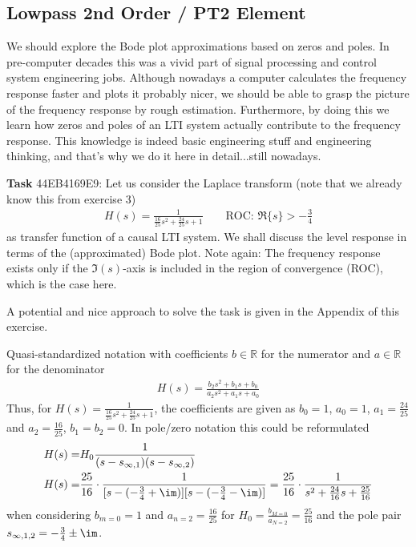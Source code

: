 \newpage
\subsection{Lowpass 2nd Order / PT2 Element}
\label{sec:44EB4169E9}
\begin{Ziel}
We should explore the Bode plot approximations based on zeros and poles.
In pre-computer decades this was a vivid part of signal
processing and control system engineering jobs.
Although nowadays a computer calculates the frequency response faster and plots it
probably nicer, we should be able to grasp the picture of the frequency response
by rough estimation. Furthermore, by doing this we learn how zeros and poles
of an LTI system actually  contribute to the frequency response. This knowledge
is indeed basic engineering stuff and engineering thinking, and that's why we do
it here in detail...still nowadays.
\end{Ziel}
\textbf{Task} {\tiny 44EB4169E9}:
Let us consider the Laplace transform (note that we already know this from
exercise 3)
\begin{align}
\label{eq:H_ODE}
H(s) = \frac{1}{\frac{16}{25} s^2 + \frac{24}{25} s + 1}\qquad\text{ROC: }
\Re\{s\}>-\frac{3}{4}
\end{align}
as transfer function of a causal LTI system.
%
We shall discuss the level response in terms of the (approximated) Bode plot.
%
Note again: The frequency response exists only if the $\Im(s)$-axis is included
in the region of convergence (ROC), which is the case here.

\begin{Werkzeug}
A potential and nice approach to solve the task is given in the Appendix of this
exercise.
\end{Werkzeug}
\begin{Ansatz}
Quasi-standardized notation with coefficients $b\in\mathbb{R}$ for the numerator and
$a\in\mathbb{R}$ for the denominator
\begin{align}
H(s) = \frac{b_2 s^2+b_1 s + b_0}{a_2 s^2+a_1 s +a_0}
\end{align}
Thus, for
$H(s) = \frac{1}{\frac{16}{25} s^2 + \frac{24}{25} s + 1}$,
the coefficients are given as
$b_0 = 1$, $a_0=1$, $a_1 = \frac{24}{25}$ and
$a_2 = \frac{16}{25}$, $b_1=b_2=0$.
%
In pole/zero notation this could be reformulated
\begin{align}
H(s) =& H_0 \frac{1}{(s-s_{\infty,1}) (s-s_{\infty,2})}\\
H(s) =& \frac{25}{16}\cdot\frac{1}{[s-(-\frac{3}{4}+\im)] [s-(-\frac{3}{4}-\im)]}
=
\frac{25}{16}\cdot\frac{1}{s^2 + \frac{24}{16} s  + \frac{25}{16}}
\end{align}
when considering $b_{m=0} = 1$ and $a_{n=2}=\frac{16}{25}$ for
$H_0 = \frac{b_{M=0}}{a_{N=2}}=\frac{25}{16}$ and the pole pair
$s_{\infty,1,2} = -\frac{3}{4} \pm \im$.
\end{Ansatz}

